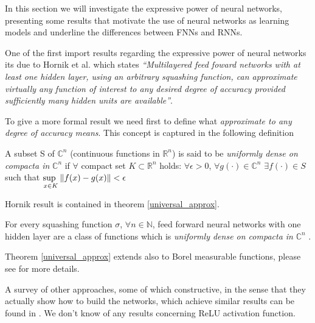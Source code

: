 In this section we will investigate the expressive power of neural networks, presenting some results that motivate the use of neural networks as learning
models and underline the differences between FNNs and RNNs. 

One of the first import results regarding the expressive power of neural networks its due to Hornik et al. \cite{Hornik89} which states
\textit{``Multilayered feed foward networks with at least one hidden layer, using an arbitrary squashing function, can approximate virtually any function
of interest to any desired degree of accuracy provided sufficiently many hidden units are available''}.

To give a more formal result we need first to define what \textit{approximate to any degree of accuracy means}. This concept is captured in the following definition
\begin{defn}
 A subset S of $\mathbb{C}^n$ (continuous functions in $\mathbb{R}^n$) is said to be \textit{uniformly dense on compacta in} $\mathbb{C}^n$ if $\forall$
 compact set $K\subset \mathbb{R}^n$ holds: $\forall \epsilon >0$, $\forall g(\cdot) \in \mathbb{C}^n$ $\exists f(\cdot) \in S$ such that 
 $\underset{x \in K}{\text{sup  }} \left\Vert f(x)-g(x) \right\Vert<\epsilon$ 
 \label{dens_compact}
\end{defn}
Hornik result is contained in theorem \ref{universal_approx}.
\begin{thm}
 For every squashing function $\sigma$, $\forall n\in \mathbb{N}$, feed forward neural
 networks with one hidden layer are a class of functions which is \textit{uniformly dense on compacta in} $\mathbb{C}^n$
\label{universal_approx}.
\end{thm}

Theorem \ref{universal_approx} extends also to Borel measurable functions, please see \cite{Hornik89} for more details.

A survey of other approaches, some of which constructive, in the sense that they actually show how to build the networks, which achieve similar results can be found in \cite{Scarselli98}.
We don't know of any results concerning ReLU activation function.

